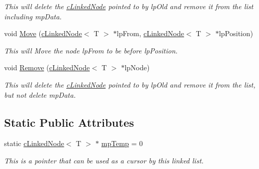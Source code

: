 \begin{DoxyCompactItemize}
\begin{DoxyCompactList}\small\item\em This will delete the \hyperlink{classc_linked_node}{cLinkedNode} pointed to by lpOld and remove it from the list including mpData. \end{DoxyCompactList}\item 
\hypertarget{classc_linked_list_a4f6cff87d2c90874949757987f6b9748}{
void \hyperlink{classc_linked_list_a4f6cff87d2c90874949757987f6b9748}{Move} (\hyperlink{classc_linked_node}{cLinkedNode}$<$ T $>$ $\ast$lpFrom, \hyperlink{classc_linked_node}{cLinkedNode}$<$ T $>$ $\ast$lpPosition)}
\label{classc_linked_list_a4f6cff87d2c90874949757987f6b9748}

\begin{DoxyCompactList}\small\item\em This will Move the node lpFrom to be before lpPosition. \end{DoxyCompactList}\item 
\hypertarget{classc_linked_list_a676cd3bd124df98773c296ed6f67ba16}{
void \hyperlink{classc_linked_list_a676cd3bd124df98773c296ed6f67ba16}{Remove} (\hyperlink{classc_linked_node}{cLinkedNode}$<$ T $>$ $\ast$lpNode)}
\label{classc_linked_list_a676cd3bd124df98773c296ed6f67ba16}

\begin{DoxyCompactList}\small\item\em This will delete the \hyperlink{classc_linked_node}{cLinkedNode} pointed to by lpOld and remove it from the list, but not delete mpData. \end{DoxyCompactList}\end{DoxyCompactItemize}
\subsection*{Static Public Attributes}
\begin{DoxyCompactItemize}
\item 
\hypertarget{classc_linked_list_abc440dbcbff9bcfb6e538a0e008c27c1}{
static \hyperlink{classc_linked_node}{cLinkedNode}$<$ T $>$ $\ast$ \hyperlink{classc_linked_list_abc440dbcbff9bcfb6e538a0e008c27c1}{mpTemp} = 0}
\label{classc_linked_list_abc440dbcbff9bcfb6e538a0e008c27c1}

\begin{DoxyCompactList}\small\item\em This is a pointer that can be used as a cursor by this linked list. \end{DoxyCompactList}\end{DoxyCompactItemize}


